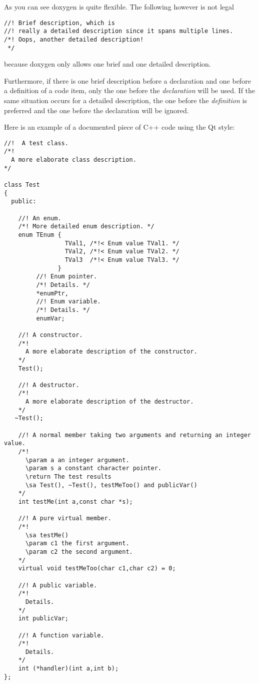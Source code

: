 As you can see doxygen is quite flexible. The following however is not legal



\footnotesize\begin{verbatim}
//! Brief description, which is
//! really a detailed description since it spans multiple lines.
/*! Oops, another detailed description!
 */
\end{verbatim}
\normalsize


because doxygen only allows one brief and one detailed description.

Furthermore, if there is one brief description before a declaration and one before a definition of a code item, only the one before the {\em declaration\/} will be used. If the same situation occurs for a detailed description, the one before the {\em definition\/} is preferred and the one before the declaration will be ignored.

Here is an example of a documented piece of C++ code using the Qt style: 

\begin{DocInclude}\begin{verbatim}//!  A test class. 
/*!
  A more elaborate class description.
*/

class Test
{
  public:

    //! An enum.
    /*! More detailed enum description. */
    enum TEnum { 
                 TVal1, /*!< Enum value TVal1. */  
                 TVal2, /*!< Enum value TVal2. */  
                 TVal3  /*!< Enum value TVal3. */  
               } 
         //! Enum pointer.
         /*! Details. */
         *enumPtr, 
         //! Enum variable.
         /*! Details. */
         enumVar;  
    
    //! A constructor.
    /*!
      A more elaborate description of the constructor.
    */
    Test();

    //! A destructor.
    /*!
      A more elaborate description of the destructor.
    */
   ~Test();
    
    //! A normal member taking two arguments and returning an integer value.
    /*!
      \param a an integer argument.
      \param s a constant character pointer.
      \return The test results
      \sa Test(), ~Test(), testMeToo() and publicVar()
    */
    int testMe(int a,const char *s);
       
    //! A pure virtual member.
    /*!
      \sa testMe()
      \param c1 the first argument.
      \param c2 the second argument.
    */
    virtual void testMeToo(char c1,char c2) = 0;
   
    //! A public variable.
    /*!
      Details.
    */
    int publicVar;
       
    //! A function variable.
    /*!
      Details.
    */
    int (*handler)(int a,int b);
};

\end{verbatim}
\end{DocInclude}
 

